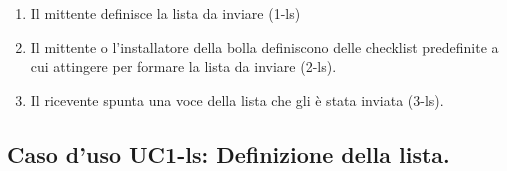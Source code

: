 \begin{itemize}
\begin{enumerate}
\item Il mittente definisce la lista da inviare (1-ls)

\item Il mittente o l'installatore della bolla definiscono delle checklist predefinite a cui attingere per formare la lista da inviare (2-ls).

\item Il ricevente spunta una voce della lista che gli è stata inviata (3-ls).



\end{enumerate} 
\end{itemize}

\clearpage

\subsection{Caso d'uso UC1-ls: Definizione della lista.}

